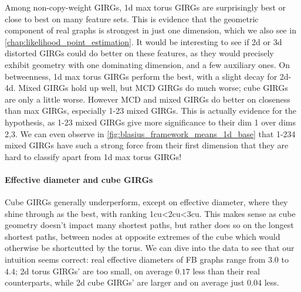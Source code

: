 Among non-copy-weight GIRGs, 1d max torus GIRGs are surprisingly best or close to best on many feature sets. This is evidence that the geometric component of real graphs is strongest in just one dimension, which we also see in \cref{chap:likelihood_point_estimation}. It would be interesting to see if 2d or 3d distorted GIRGs could do better on these features, as they would precisely exhibit geometry with one dominating dimension, and a few auxiliary ones.
On betweenness, 1d max torus GIRGs perform the best, with a slight decay for 2d-4d. Mixed GIRGs hold up well, but MCD GIRGs do much worse; cube GIRGs are only a little worse.
However MCD and mixed GIRGs do better on closeness than max GIRGs, especially 1-23 mixed GIRGs. This is actually evidence for the  hypothesis, as 1-23 mixed GIRGs give more significance to their dim 1 over dims 2,3. We can even observe in \cref{fig:blasius_framework_means_1d_base} that 1-234 mixed GIRGs have such a strong force from their first dimension that they are hard to classify apart from 1d max torus GIRGs!

\paragraph{Effective diameter and cube GIRGs}
Cube GIRGs generally underperform, except on effective diameter, where they shine through as the best, with ranking 1cu\textless 2cu\textless 3cu. This makes sense as cube geometry doesn't impact many shortest paths, but rather does so on the longest shortest paths, between nodes at opposite extremes of the cube which would otherwise be shortcutted by the torus. We can dive into the data to see that our intuition seems correct: real effective diameters of FB graphs range from $3.0$ to $4.4$; 2d torus GIRGs' are too small, on average $0.17$ less than their real counterparts, while 2d cube GIRGs' are larger and on average just $0.04$ less.






